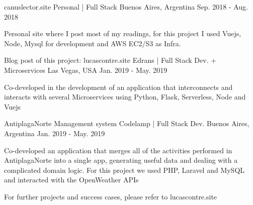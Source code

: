 

\begin{cventries}

    \cventry
    {canuslector.site} %
    {Personal | Full Stack} %
    {Buenos Aires, Argentina} %
    {Sep. 2018 - Aug. 2018} %
    {
    \begin{cvitems} %
        \item {Personal site where I post most of my readings, for this project I used Vuejs, Node, Mysql for development and AWS EC2/S3 as Infra.}
    \end{cvitems}
    }

    \cventry
    {Blog post of this project: lucascontre.site} %
    {Edrans | Full Stack Dev. + Microservices} %
    {Las Vegas, USA} %
    {Jan. 2019 - May. 2019} %
    {
    \begin{cvitems} %
        \item {Co-developed in the development of an application that interconnects and interacts with several Microservices using Python, Flask, Serverless, Node and Vuejs}
    \end{cvitems}
    }
    \cventry
    {AntiplagaNorte Management system} %
    {Codelamp | Full Stack Dev.} %
    {Buenos Aires, Argentina} %
    {Jan. 2019 - May. 2019} %
    {
    \begin{cvitems} %
        \item {Co-developed an application that merges all of the activities performed in AntiplagaNorte into a single app, generating useful data and dealing with a complicated domain logic. For this project we used PHP, Laravel and MySQL and interacted with the OpenWeather APIs}
    \end{cvitems}
    }
    \cventry
    {} %
    {} %
    {} %
    {} %
    {
    \begin{cvitems} %
        \item {For further projects and success cases, please refer to lucascontre.site}
    \end{cvitems}
    }

\end{cventries}

